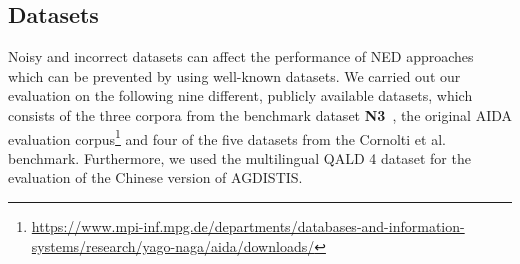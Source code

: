 
\subsection{Datasets}
Noisy and incorrect datasets can affect the performance of \ac{NED} approaches which can be prevented by using well-known datasets.
We carried out our evaluation on the following nine different, publicly available datasets, which consists of the three corpora from the benchmark dataset \textbf{N3}~\cite{n3}, the original AIDA evaluation corpus\footnote{\url{https://www.mpi-inf.mpg.de/departments/databases-and-information-systems/research/yago-naga/aida/downloads/}} and four of the five datasets from the Cornolti et al.~\cite{cornolti} benchmark. Furthermore, we used the multilingual QALD 4 dataset for the evaluation of the Chinese version of AGDISTIS.

